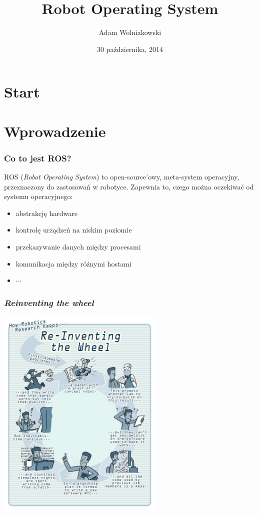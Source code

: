 \documentclass[12pt,a4paper,portrait]{beamer}
\author[AW]{Adam Wolniakowski}
\institute[WM PB]{Politechnika Białostocka}
\title[ROS]{Robot Operating System}
\date{30 października, 2014}
\begin{document}
\section{Start}
\begin{frame}
\titlepage
\end{frame}



\section{Wprowadzenie}
\begin{frame}
\frametitle{Co to jest ROS?}
ROS (\textit{Robot Operating System}) to open-source'owy, meta-system operacyjny, przeznaczony do zastosowań w robotyce.
Zapewnia to, czego można oczekiwać od systemu operacyjnego:
\begin{itemize}
\item abstrakcję hardware
\item kontrolę urządzeń na niskim poziomie
\item przekazywanie danych między procesami
\item komunikacja między różnymi hostami
\item $\cdots$
\end{itemize}
\end{frame}


\begin{frame}
\frametitle{\textit{Reinventing the wheel}}
\begin{center}
\includegraphics[width=0.6\textwidth]{pics/comic1.jpg}
\end{center}
\end{frame}
\end{document}
